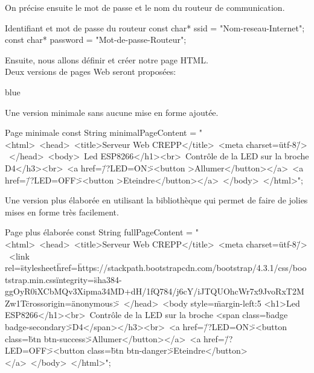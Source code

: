 On précise ensuite le mot de passe et le nom du routeur de communication.

\begin{Cpp}{Identifiant et mot de passe du routeur}
const char* ssid     = "Nom-reseau-Internet";
const char* password = "Mot-de-passe-Routeur";
\end{Cpp}


Ensuite, nous allons définir et créer notre page HTML.\\

Deux versions de pages Web seront proposées:

\begin{items}{blue}{\Triangle}
    \item Une version minimale sans aucune mise en forme ajoutée.

    \begin{Cpp}{Page minimale}
        const String minimalPageContent = "<html>\
        <head>\
            <title>Serveur Web CREPP</title>\
            <meta charset=\"utf-8\"/> \
            </head>\
            <body>\
            <h1>Led ESP8266</h1><br>\
                <h3>Contrôle de la LED sur la broche D4</h3><br>\
                  <a href=\"/?LED=ON\"><button >Allumer</button></a>\
                  <a href=\"/?LED=OFF\"><button >Eteindre</button></a>\
              </body>\
            </html>";
        \end{Cpp}


        \item Une version plus élaborée en utilisant la bibliothèque  qui permet de faire de 
        jolies mises en forme très facilement.

        \begin{Cpp}{Page plus élaborée}
            const String fullPageContent = "<html>\
            <head>\
              <title>Serveur Web CREPP</title>\
              <meta charset=\"utf-8\"/> \
              <link rel=\"stylesheet\" href=\"https://stackpath.bootstrapcdn.com/bootstrap/4.3.1/css/bootstrap.min.css\" integrity=\"sha384-ggOyR0iXCbMQv3Xipma34MD+dH/1fQ784/j6cY/iJTQUOhcWr7x9JvoRxT2MZw1T\" crossorigin=\"anonymous\">\
            </head>\
            <body style=\"margin-left:5%
              <h1>Led ESP8266</h1><br>\
              <h3>Contrôle de la LED sur la broche <span class=\"badge badge-secondary\">D4</span></h3><br>\
                <a href=\"/?LED=ON\"><button class=\"btn btn-success\">Allumer</button></a>\
                <a href=\"/?LED=OFF\"><button class=\"btn btn-danger\">Eteindre</button></a>\
            </body>\
          </html>";
            \end{Cpp}   
\end{items}

